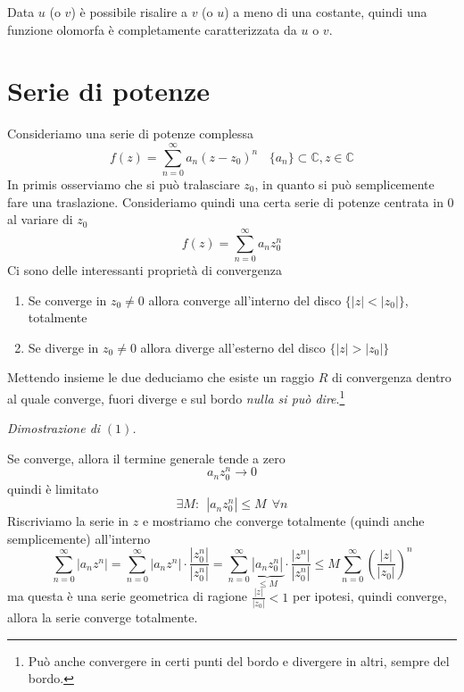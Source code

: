 \documentclass[10pt,a4paper,twoside]{book}
\begin{document}
Data $u$ (o $v$) è possibile risalire a $v$ (o $u$) a meno di una costante, quindi una funzione olomorfa è completamente caratterizzata da $u$ o $v$.
\section{Serie di potenze}

Consideriamo una serie di potenze complessa
\begin{equation*}
f( z) =\sum\limits ^{\infty }_{n=0} a_{n}( z-z_{0})^{n} \ \ \ \ \{a_{n}\} \subset \mathbb{C} ,z\in \mathbb{C}
\end{equation*}
In primis osserviamo che si può tralasciare $z_{0}$, in quanto si può semplicemente fare una traslazione. Consideriamo quindi una certa serie di potenze centrata in $0$ al variare di $z_{0}$
\begin{equation*}
f( z) =\sum\limits ^{\infty }_{n=0} a_{n} z^{n}_{0}
\end{equation*}
Ci sono delle interessanti proprietà di convergenza
\begin{enumerate}
\item Se converge in $z_{0} \neq 0$ allora converge all'interno del disco $\{| z| < | z_{0}| \}$, totalmente
\item Se diverge in $z_{0} \neq 0$ allora diverge all'esterno del disco $\{| z|  >| z_{0}| \}$
\end{enumerate}

Mettendo insieme le due deduciamo che esiste un raggio $R$ di convergenza dentro al quale converge, fuori diverge e sul bordo \textit{nulla si può dire}.\footnote{Può anche convergere in certi punti del bordo e divergere in altri, sempre del bordo.}



\textit{Dimostrazione di }$( 1)$\textit{.}

Se converge, allora il termine generale tende a zero
\begin{equation*}
a_{n} z^{n}_{0}\rightarrow 0
\end{equation*}
quindi è limitato
\begin{equation*}
\exists M:\ \ \left| a_{n} z^{n}_{0}\right| \leqslant M\ \ \forall n
\end{equation*}
Riscriviamo la serie in $z$ e mostriamo che converge totalmente (quindi anche semplicemente) all'interno
\begin{equation*}
\sum\limits ^{\infty }_{n=0}\left| a_{n} z^{n}\right| =\sum\limits ^{\infty }_{n=0}\left| a_{n} z^{n}\right| \cdotp \frac{\left| z^{n}_{0}\right| }{\left| z^{n}_{0}\right| } =\sum\limits ^{\infty }_{n=0}\underbrace{\left| a_{n} z^{n}_{0}\right| }_{\leqslant M} \cdotp \frac{\left| z^{n}\right| }{\left| z^{n}_{0}\right| } \leqslant M\sum\limits ^{\infty }_{n=0}\left(\frac{| z| }{| z_{0}| }\right)^{n}
\end{equation*}
ma questa è una serie geometrica di ragione $\frac{| z| }{| z_{0}| } < 1$ per ipotesi, quindi converge, allora la serie converge totalmente.
\end{document}

